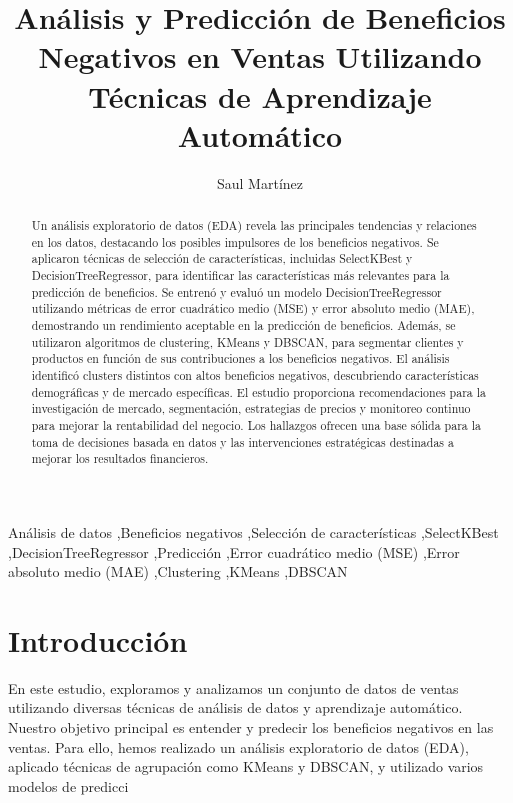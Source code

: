 \documentclass[preprint,12pt]{elsarticle}
\begin{document}
\begin{frontmatter}

\title{Análisis y Predicción de Beneficios Negativos en Ventas Utilizando Técnicas de Aprendizaje Automático}

\author[UANL]{Saul Martínez}
\address[UANL]{Universidad Autónoma de Nuevo León, Mexico}

\begin{abstract}
Un análisis exploratorio de datos (EDA) revela las principales tendencias y relaciones en los datos, destacando los posibles impulsores de los beneficios negativos. Se aplicaron técnicas de selección de características, incluidas SelectKBest y DecisionTreeRegressor, para identificar las características más relevantes para la predicción de beneficios. Se entrenó y evaluó un modelo DecisionTreeRegressor utilizando métricas de error cuadrático medio (MSE) y error absoluto medio (MAE), demostrando un rendimiento aceptable en la predicción de beneficios. Además, se utilizaron algoritmos de clustering, KMeans y DBSCAN, para segmentar clientes y productos en función de sus contribuciones a los beneficios negativos. El análisis identificó clusters distintos con altos beneficios negativos, descubriendo características demográficas y de mercado específicas. El estudio proporciona recomendaciones para la investigación de mercado, segmentación, estrategias de precios y monitoreo continuo para mejorar la rentabilidad del negocio. Los hallazgos ofrecen una base sólida para la toma de decisiones basada en datos y las intervenciones estratégicas destinadas a mejorar los resultados financieros.
\end{abstract}

\begin{keyword}
Análisis de datos \sep Beneficios negativos \sep Selección de características \sep SelectKBest \sep DecisionTreeRegressor \sep Predicción \sep Error cuadrático medio (MSE) \sep Error absoluto medio (MAE) \sep Clustering \sep KMeans \sep DBSCAN 
\end{keyword}

\end{frontmatter}

\section{Introducción}
En este estudio, exploramos y analizamos un conjunto de datos de ventas utilizando diversas técnicas de análisis de datos y aprendizaje automático. Nuestro objetivo principal es entender y predecir los beneficios negativos en las ventas. Para ello, hemos realizado un análisis exploratorio de datos (EDA), aplicado técnicas de agrupación como KMeans y DBSCAN, y utilizado varios modelos de predicci
\end{document}
